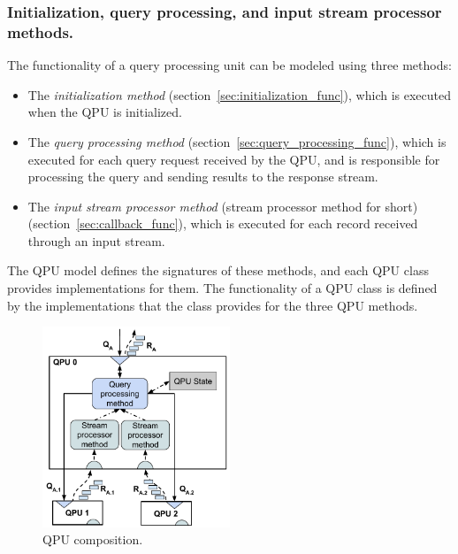 \subsubsection{Initialization, query processing, and input stream processor methods.}
The functionality of a query processing unit can be modeled using three methods:
\begin{itemize}
  \item The \textit{initialization method} (section~\ref{sec:initialization_func}), which is executed when the QPU is
  initialized.

  \item The \textit{query processing method} (section~\ref{sec:query_processing_func}), which is executed for each
  query request received by the QPU, and is responsible for processing the query and sending results to the response stream.

  \item The \textit{input stream processor method} (stream processor method for short) (section~\ref{sec:callback_func}), which is executed for each record
  received through an input stream.

\end{itemize}

The QPU model defines the signatures of these methods, and each QPU class provides implementations for them.
The functionality of a QPU class is defined by the implementations that the class provides for the three QPU methods.

\begin{figure}[H]
  \centering
    \includegraphics[width=0.5\textwidth]{./figures/design_pattern/qpu_abstraction.pdf}
  \caption{QPU composition.}
  \label{fig:qpu_abstraction}
\end{figure}

